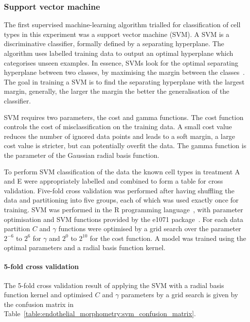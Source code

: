 \subsubsection{Support vector machine}
The first supervised machine-learning algorithm trialled for classification of cell types in this experiment was a support vector machine (SVM). A SVM is a discriminative classifier, formally defined by a separating hyperplane. The algorithm uses labelled training data to output an optimal hyperplane which categorises unseen examples. In essence, SVMs look for the optimal separating hyperplane between two classes, by maximising the margin between the classes~\cite{Cortes1995}. The goal in training a SVM is to find the separating hyperplane with the largest margin, generally, the larger the margin the better the generalisation of the classifier.

SVM requires two parameters, the cost and gamma functions. The cost function controls the cost of misclassification on the training data. A small cost value reduces the number of ignored data points and leads to a soft margin, a large cost value is stricter, but can potentially overfit the data. The gamma function is the parameter of the Gaussian radial basis function.

To perform SVM classification of the data the known cell types in treatment A and E were appropriately labelled and combined to form a table for cross validation. Five-fold cross validation was performed after having shuffling the data and partitioning into five groups, each of which was used exactly once for training. SVM was performed in the R programming language~\cite{RCoreTeam2014}, with parameter optimisation and SVM functions provided by the e1071 package~\cite{Hornik2015}. For each data partition $C$ and $\gamma$ functions were optimised by a grid search over the parameter $2^{-6}$ to $2^{6}$ for $\gamma$ and $2^{0}$ to $2^{10}$ for the cost function. A model was trained using the optimal parameters and a radial basis function kernel.

\paragraph{5-fold cross validation}
The 5-fold cross validation result of applying the SVM with a radial basis function kernel and  optimised $C$ and $\gamma$ parameters by a grid search is given by the confusion matrix in Table~\ref{table:endothelial_morphometry:svm_confusion_matrix}.


